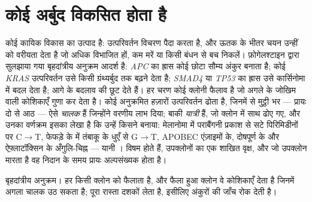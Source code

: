 \section{कोई अर्बुद विकसित होता है}

\begin{proposition}\label{prop:b3:cancer-biology:multistep}
कोई  कायिक विकास का उत्पाद है: उत्परिवर्तन विचरण पैदा करता है, और
ऊतक के भीतर चयन उन्हीं को वरीयता देता है जो अधिक विभाजित हों, कम मरें
या किसी बंधन से बच निकलें। फ़ोगेलश्टाइन द्वारा सुलझाया गया
बृहदांत्रीय अनुक्रम आदर्श है: \emph{APC} का ह्रास कोई छोटा सौम्य
अंकुर बनाता है; कोई \emph{KRAS} उत्परिवर्तन उसे किसी ग्रंथ्यर्बुद तक
बढ़ने देता है; \emph{SMAD4} या \emph{TP53} का ह्रास उसे कार्सिनोमा में
बदल देता है; आगे के बदलाव  की छूट देते हैं। हर चरण कोई क्लोनी
फैलाव है जो अगले के जोखिम वाली कोशिकाएँ गुणा कर देता है। कोई अनुक्रमित
 हज़ारों उत्परिवर्तन ढोता है, जिनमें से मुट्ठी भर --- प्रायः दो
से आठ --- ऐसे \emph{चालक} हैं जिन्होंने वरणीय लाभ दिया; बाकी
\emph{यात्री} हैं, जो क्लोन में साथ ढोए गए, और उनका वर्णक्रम इसका लेखा
है कि उन्हें किसने बनाया: मेलानोमा में पराबैंगनी प्रकाश से सटे
पिरिमिडीनों पर C$\to$T, फेफड़े के  में तंबाकू के धुएँ से
G$\to$T, APOBEC एंज़ाइमों के, दोषपूर्ण  के और ऐफ़्लाटॉक्सिन
के अँगुलि-चिह्न --- यानी \emph{}।  विषम
होते हैं, उपक्लोनों का एक शाखित वृक्ष, और जो उपक्लोन मारता है वह निदान
के समय प्रायः अल्पसंख्यक होता है।
\end{proposition}

\begin{omfigure}

{\small बृहदांत्रीय अनुक्रम। हर  किसी क्लोन को फैलाता
है, और फैला हुआ क्लोन वे कोशिकाएँ देता है जिनमें अगला चालक उठ सकता है;
पूरा रास्ता दशकों लेता है, इसीलिए अंकुरों की जाँच  रोक देती है।}
\end{omfigure}


